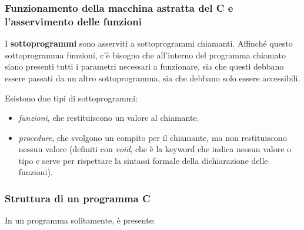 \documentclass[
]{article}
\begin{document}
\hypertarget{header-n754}{%
\subsubsection{Funzionamento della macchina astratta del C e
l'asservimento delle funzioni}\label{header-n754}}

I \textbf{sottoprogrammi} sono asserviti a sottoprogrammi chiamanti.
Affinché questo sottoprogramma funzioni, c'è bisogno che all'interno del
programma chiamato siano presenti tutti i parametri necessari a
funzionare, sia che questi debbano essere passati da un altro
sottoprogramma, sia che debbano solo essere accessibili.

Esistono due tipi di sottoprogrammi:

\begin{itemize}
\item
  \emph{funzioni}, che restituiscono un valore al chiamante.
\end{itemize}

\begin{itemize}
\item
  \emph{procedure}, che svolgono un compito per il chiamante, ma non
  restituiscono nessun valore (definiti con \emph{void}, che è la
  keyword che indica nessun valore o tipo e serve per rispettare la
  sintassi formale della dichiarazione delle funzioni).
\end{itemize}

\hypertarget{header-n764}{%
\subsubsection{Struttura di un programma C}\label{header-n764}}

In un programma solitamente, è presente:
\end{document}
